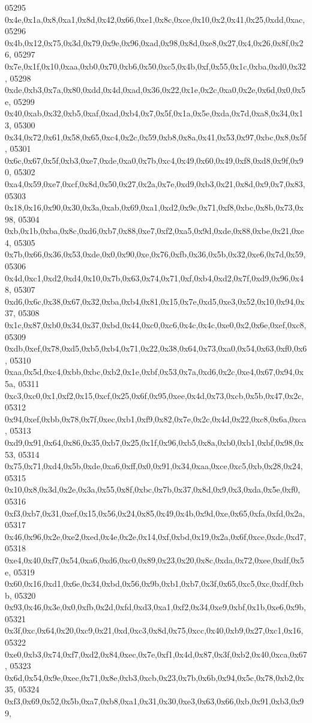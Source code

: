 \begin{DoxyCode}
05295   0x4e,0x1a,0x8,0xa1,0x8d,0x42,0x66,0xe1,0x8c,0xce,0x10,0x2,0x41,0x25,0xdd,0xac,
05296   0x4b,0x12,0x75,0x3d,0x79,0x9e,0x96,0xad,0x98,0x8d,0xe8,0x27,0x4,0x26,0x8f,0x26,
05297   0x7e,0x1f,0x10,0xaa,0xb0,0x70,0xb6,0x50,0xc5,0x4b,0xf,0x55,0x1c,0xba,0xd0,0x32,
05298   0xde,0xb3,0x7a,0x80,0xdd,0x4d,0xad,0x36,0x22,0x1e,0x2c,0xa0,0x2e,0x6d,0x0,0x5e,
05299   0x40,0xab,0x32,0xb5,0xaf,0xad,0xb4,0x7,0x5f,0x1a,0x5e,0xda,0x7d,0xa8,0x34,0x13,
05300   0x34,0x72,0x61,0x58,0x65,0xc4,0x2c,0x59,0xb8,0x8a,0x41,0x53,0x97,0xbc,0x8,0x5f,
05301   0x6c,0x67,0x5f,0xb3,0xe7,0xde,0xa0,0x7b,0xc4,0x49,0x60,0x49,0xf8,0xd8,0x9f,0x90,
05302   0xa4,0x59,0xe7,0xcf,0x8d,0x50,0x27,0x2a,0x7e,0xd9,0xb3,0x21,0x8d,0x9,0x7,0x83,
05303   0x18,0x16,0x90,0x30,0x3a,0xab,0x69,0xa1,0xd2,0x9c,0x71,0xf8,0xbc,0x8b,0x73,0x98,
05304   0xb,0x1b,0xba,0x8c,0xd6,0xb7,0x88,0xe7,0xf2,0xa5,0x9d,0xde,0x88,0xbe,0x21,0xe4,
05305   0x7b,0x66,0x36,0x53,0xde,0x0,0x90,0xe,0x76,0xfb,0x36,0x5b,0x32,0xe6,0x7d,0x59,
05306   0x4d,0xc1,0xd2,0xd4,0x10,0x7b,0x63,0x74,0x71,0xf,0xb4,0xd2,0x7f,0xd9,0x96,0x48,
05307   0xd6,0x6c,0x38,0x67,0x32,0xba,0xb4,0x81,0x15,0x7e,0xd5,0xe3,0x52,0x10,0x94,0x37,
05308   0x1c,0x87,0xb0,0x34,0x37,0xbd,0x44,0xc0,0xc6,0x4c,0x4c,0xe0,0x2,0x6e,0xef,0xc8,
05309   0xdb,0xef,0x78,0xd5,0xb5,0xb4,0x71,0x22,0x38,0x64,0x73,0xa0,0x54,0x63,0xf0,0x6,
05310   0xaa,0x5d,0xc4,0xbb,0xbc,0xb2,0x1e,0xbf,0x53,0x7a,0xd6,0x2c,0xe4,0x67,0x94,0x5a,
05311   0xc3,0xc0,0x1,0xf2,0x15,0xcf,0x25,0x6f,0x95,0xee,0x4d,0x73,0xcb,0x5b,0x47,0x2c,
05312   0x94,0xef,0xbb,0x78,0x7f,0xec,0xb1,0xf9,0x82,0x7e,0x2c,0x4d,0x22,0xc8,0x6a,0xca,
05313   0xd9,0x91,0x64,0x86,0x35,0xb7,0x25,0x1f,0x96,0xb5,0x8a,0xb0,0xb1,0xbf,0x98,0x53,
05314   0x75,0x71,0xd4,0x5b,0xde,0xa6,0xff,0x0,0x91,0x34,0xaa,0xce,0xc5,0xb,0x28,0x24,
05315   0x10,0x8,0x3d,0x2e,0x3a,0x55,0x8f,0xbc,0x7b,0x37,0x8d,0x9,0x3,0xda,0x5e,0xf0,
05316   0xf3,0xb7,0x31,0xef,0x15,0x56,0x24,0x85,0x49,0x4b,0x9d,0xe,0x65,0xfa,0xfd,0x2a,
05317   0x46,0x96,0x2e,0xe2,0xed,0x4e,0x2e,0x14,0xf,0xbd,0x19,0x2a,0x6f,0xce,0xdc,0xd7,
05318   0xe4,0x40,0xf7,0x54,0xa6,0xd6,0xc0,0x89,0x23,0x20,0x8c,0xda,0x72,0xee,0xdf,0x5e,
05319   0x60,0x16,0xd1,0x6e,0x34,0xbd,0x56,0x9b,0xb1,0xb7,0x3f,0x65,0xc5,0xc,0xdf,0xbb,
05320   0x93,0x46,0x3e,0x0,0xfb,0x2d,0xfd,0xd3,0xa1,0xf2,0x34,0xe9,0xbf,0x1b,0xe6,0x9b,
05321   0x3f,0xc,0x64,0x20,0xc9,0x21,0xd,0xc3,0x8d,0x75,0xcc,0x40,0xb9,0x27,0xc1,0x16,
05322   0xe0,0xb3,0x74,0xf7,0xd2,0x84,0xec,0x7e,0xf1,0x4d,0x87,0x3f,0xb2,0x40,0xca,0x67,
05323   0x6d,0x54,0x9e,0xec,0x71,0x8e,0xb3,0xcb,0x23,0x7b,0x6b,0x94,0x5c,0x78,0xb2,0x35,
05324   0xf3,0x69,0x52,0x5b,0xa7,0xb8,0xa1,0x31,0x30,0xe3,0x63,0x66,0xb,0x91,0xb3,0x99,

\end{DoxyCode}
